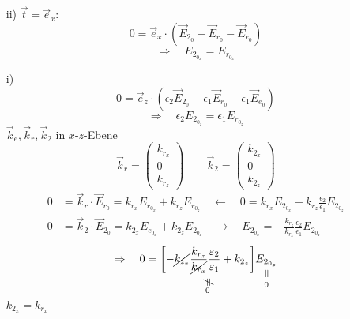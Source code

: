 \begin{enumerate}
	\item[ii)] $ \vec{t} = \vec{e}_x: $
	\begin{equation*}
	0 = \vec{e}_x \cdot (\vec{E}_{2_0} - \vec{E}_{r_0} - \vec{E}_{e_0})
	\end{equation*}
	\begin{equation*}
	\Rightarrow \quad E_{2_{0_x}} = E_{r_{0_x}}
	\end{equation*}
	\item[i)]
	\begin{equation*}
	0 = \vec{e}_z \cdot (\epsilon_2 \vec{E}_{2_0} - \epsilon_1 \vec{E}_{r_0} - \epsilon_1 \vec{E}_{e_0})
	\end{equation*}
	\begin{equation*}
	\Rightarrow \quad \epsilon_2 E_{2_{0_z}} = \epsilon_1 E_{r_{0_z}}
	\end{equation*}
	$ \vec{k}_e, \vec{k}_r, \vec{k}_2 $ in $ x $-$ z $-Ebene
	\begin{equation*}
	\vec{k}_r = \begin{pmatrix}
	k_{r_x} \\ 0 \\ k_{r_z}
	\end{pmatrix} \qquad \vec{k}_2 = \begin{pmatrix}
	k_{2_x} \\ 0 \\ k_{2_z}
	\end{pmatrix}
	\end{equation*}
	\begin{align*}
	0 &= \vec{k}_r \cdot \vec{E}_{r_0} = k_{r_x} E_{r_{0_x}} + k_{r_z} E_{r_{0_z}} \quad \leftarrow \quad 0 = k_{r_x} E_{2_{0_x}} + k_{r_z} \frac{\epsilon_2}{\epsilon_1} E_{2_{0_z}} \\
	0 &= \vec{k}_2 \cdot \vec{E}_{2_0} = k_{2_x} E_{e_{0_x}} + k_{2_z} E_{2_{0_z}} \quad \rightarrow \quad E_{2_{0_x}} = - \frac{k_{r_z}}{k_{r_x}} \frac{\epsilon_2}{\epsilon_1} E_{2_{0_z}}
	\end{align*}
	\begin{equation*}
	\Rightarrow \quad 0 = \custo{\neq}{\left[- \cancel{k_{z_x}} \frac{k_{r_z}}{\cancel{k_{r_x}}} \frac{\epsilon_2}{\epsilon_1} + k_{2_z}\right]}{0} \equalto{E_{2_{0_z}}}{0}
	\end{equation*}
	$ k_{2_x} = k_{r_x} $
\end{enumerate}




